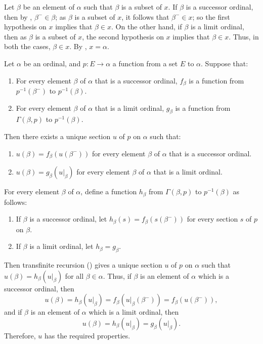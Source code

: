 \documentclass{article}
\begin{document}
Let \(\beta\) be an element of \(\alpha\) such that \(\beta\) is a
subset of \(x\).  If \(\beta\) is a successor ordinal, then by
, \(\beta^- \in \beta\); as \(\beta\) is a subset
of \(x\), it follows that \(\beta^- \in x\); so the first hypothesis
on \(x\) implies that \(\beta \in x\).  On the other hand, if
\(\beta\) is a limit ordinal, then as \(\beta\) is a subset of \(x\),
the second hypothesis on \(x\) implies that \(\beta \in x\).  Thus, in
both the cases, \(\beta \in x\).  By ,
\(x = \alpha\).

\begin{theorem}
  \label{thm:7oq31ljz}
  Let \(\alpha\) be an ordinal, and \(p : E \to \alpha\) a function
  from a set \(E\) to \(\alpha\).  Suppose that:
  \begin{enumerate}
  \item For every element \(\beta\) of \(\alpha\) that is a successor
    ordinal, \(f_\beta\) is a function from \(p^{-1}(\beta^-)\) to
    \(p^{-1}(\beta)\).
  \item For every element \(\beta\) of \(\alpha\) that is a limit
    ordinal, \(g_\beta\) is a function from \(\Gamma(\beta, p)\) to
    \(p^{-1}(\beta)\).
  \end{enumerate}
  Then there exists a unique section \(u\) of \(p\) on \(\alpha\) such
  that:
  \begin{enumerate}
  \item \(u(\beta) = f_\beta(u(\beta^-))\) for every element \(\beta\)
    of \(\alpha\) that is a successor ordinal.
  \item \(u(\beta) = g_\beta(u \vert_\beta)\) for every element
    \(\beta\) of \(\alpha\) that is a limit ordinal.
  \end{enumerate}
\end{theorem}

For every element \(\beta\) of \(\alpha\), define a function
\(h_\beta\) from \(\Gamma(\beta, p)\) to \(p^{-1}(\beta)\) as follows:
\begin{enumerate}
\item If \(\beta\) is a successor ordinal, let
  \(h_\beta(s) = f_\beta(s(\beta^-))\) for every section \(s\) of
  \(p\) on \(\beta\).
\item If \(\beta\) is a limit ordinal, let \(h_\beta = g_\beta\).
\end{enumerate}
Then transfinite recursion () gives a unique
section \(u\) of \(p\) on \(\alpha\) such that
\(u(\beta) = h_\beta(u \vert_\beta)\) for all \(\beta \in \alpha\).
Thus, if \(\beta\) is an element of \(\alpha\) which is a successor
ordinal, then
\begin{displaymath}
  u(\beta) =
  h_\beta(u \vert_\beta) =
  f_\beta(u \vert_\beta (\beta^-)) =
  f_\beta(u(\beta^-)),
\end{displaymath}
and if \(\beta\) is an element of \(\alpha\) which is a limit
ordinal, then
\begin{displaymath}
  u(\beta) = h_\beta(u \vert_\beta) = g_\beta(u \vert_\beta).
\end{displaymath}
Therefore, \(u\) has the required properties.
\end{document}

